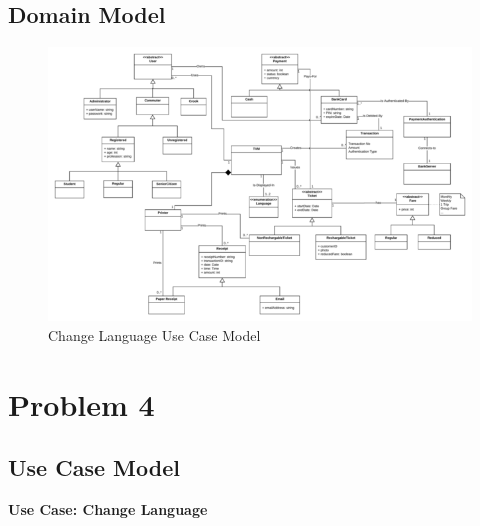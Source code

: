 \documentclass[a4paper,12pt]{report}
\begin{document}
\subsection{Domain Model}
\begin{figure}[!htb]
	\centering
	\includegraphics[width=1\textwidth]{domain_model.png}
	\caption{\label{fig:Use Case Model : } Change Language Use Case Model}	
\end{figure}


\newpage
\section{Problem 4}
\subsection{Use Case Model}

\vspace{0.5cm}
\textbf{\large Use Case: Change Language} 
\\ 
\end{document}
